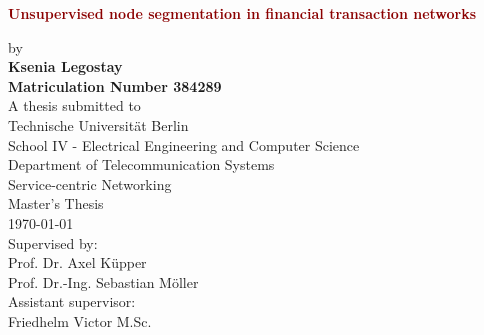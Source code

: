 \begin{titlepage}
	\strut
	\hfill
	\begin{center}
	\vspace{1cm}
		\Huge
		\begin{spacing}{.9}
			\textcolor{DarkRed}{\textbf{Unsupervised node segmentation in financial transaction networks}}\\
		\end{spacing}
		\vspace{0.8cm}
		\large
		by\\
		\vspace{0.8cm}
		\textbf{Ksenia Legostay}\\
		\vspace{0.8cm}
		\textbf{Matriculation Number 384289}\\
		\vspace{2cm}
	 	A thesis submitted to\\
		\vspace{0.5cm}
		Technische Universität Berlin\\
		School IV - Electrical Engineering and Computer Science\\
		Department of Telecommunication Systems\\
		Service-centric Networking\\
		\vspace{0.5cm}
		Master's Thesis\\
		\vspace{2.2cm}
		\today\\
		\vspace{2.0cm}
		\large
		Supervised by:\\
		Prof. Dr. Axel Küpper\\
		Prof. Dr.-Ing. Sebastian Möller\\
		\vspace{1cm}
		Assistant supervisor:\\
		Friedhelm Victor M.Sc.
		\end{center}
\end{titlepage}

\shipout\null
\shipout\null
